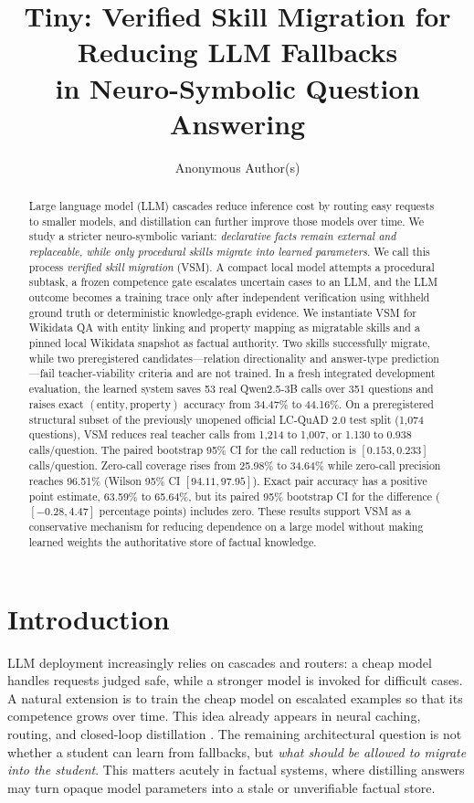 \documentclass[10pt]{article}
\title{Tiny: Verified Skill Migration for Reducing LLM Fallbacks\\in Neuro-Symbolic Question Answering}
\author{Anonymous Author(s)}
\date{}
\begin{document}
\maketitle

\begin{abstract}
Large language model (LLM) cascades reduce inference cost by routing easy requests to smaller models, and distillation can further improve those models over time. We study a stricter neuro-symbolic variant: \emph{declarative facts remain external and replaceable, while only procedural skills migrate into learned parameters}. We call this process \emph{verified skill migration} (VSM). A compact local model attempts a procedural subtask, a frozen competence gate escalates uncertain cases to an LLM, and the LLM outcome becomes a training trace only after independent verification using withheld ground truth or deterministic knowledge-graph evidence. We instantiate VSM for Wikidata QA with entity linking and property mapping as migratable skills and a pinned local Wikidata snapshot as factual authority. Two skills successfully migrate, while two preregistered candidates---relation directionality and answer-type prediction---fail teacher-viability criteria and are not trained. In a fresh integrated development evaluation, the learned system saves 53 real Qwen2.5-3B calls over 351 questions and raises exact $(\mathrm{entity},\mathrm{property})$ accuracy from 34.47\% to 44.16\%. On a preregistered structural subset of the previously unopened official LC-QuAD 2.0 test split (1,074 questions), VSM reduces real teacher calls from 1,214 to 1,007, or 1.130 to 0.938 calls/question. The paired bootstrap 95\% CI for the call reduction is $[0.153,0.233]$ calls/question. Zero-call coverage rises from 25.98\% to 34.64\% while zero-call precision reaches 96.51\% (Wilson 95\% CI $[94.11,97.95]$). Exact pair accuracy has a positive point estimate, 63.59\% to 65.64\%, but its paired 95\% bootstrap CI for the difference ($[-0.28,4.47]$ percentage points) includes zero. These results support VSM as a conservative mechanism for reducing dependence on a large model without making learned weights the authoritative store of factual knowledge.
\end{abstract}

\section{Introduction}

LLM deployment increasingly relies on cascades and routers: a cheap model handles requests judged safe, while a stronger model is invoked for difficult cases. A natural extension is to train the cheap model on escalated examples so that its competence grows over time. This idea already appears in neural caching, routing, and closed-loop distillation \cite{ramirez2024cache,ong2024routellm,guo2026routenlp,yao2026mera}. The remaining architectural question is not whether a student can learn from fallbacks, but \emph{what should be allowed to migrate into the student}. This matters acutely in factual systems, where distilling answers may turn opaque model parameters into a stale or unverifiable factual store.
\end{document}
